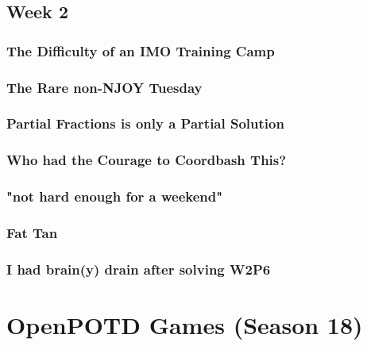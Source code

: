 \documentclass[titlepage=true]{scrartcl}
\begin{document}
{    \subsection{Week 2}

    \subsubsection{The Difficulty of an IMO Training Camp}
    \label{17.2.1}
    
    \newpage

    \subsubsection{The Rare non-NJOY Tuesday}
	\label{17.2.2}
	
	\newpage

    \subsubsection{Partial Fractions is only a Partial Solution}
	\label{17.2.3}
	
	\newpage

    \subsubsection{Who had the Courage to Coordbash This?}
	\label{17.2.4}
	
	\newpage
	
	\subsubsection{"not hard enough for a weekend"}
	\label{17.2.5}
	
	\newpage

	\subsubsection{Fat Tan}
	\label{17.2.6}
	
	\newpage

    \subsubsection{I had brain(y) drain after solving W2P6}
	\label{17.2.7}
	
	\newpage

{
\section{OpenPOTD Games (Season 18)}

}}
\end{document}
